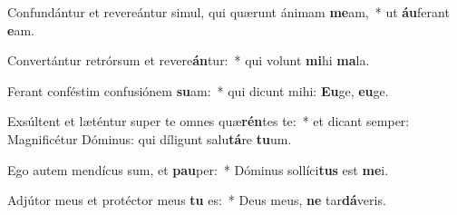 \item Confundántur et revereántur simul, qui quærunt ánimam \textbf{me}am,~* ut \textbf{áu}ferant \textbf{e}am.
\item Convertántur retrórsum et revere\textbf{án}tur:~* qui volunt \textbf{mi}hi \textbf{ma}la.
\item Ferant conféstim confusiónem \textbf{su}am:~* qui dicunt mihi: \textbf{Eu}ge, \textbf{eu}ge.
\item Exsúltent et læténtur super te omnes quæ\textbf{rén}tes te:~* et dicant semper: Magnificétur Dóminus: qui díligunt salu\textbf{tá}re \textbf{tu}um.
\item Ego autem mendícus sum, et \textbf{pau}per:~* Dóminus sollíci\textbf{tus} est \textbf{me}i.
\item Adjútor meus et protéctor meus \textbf{tu} es:~* Deus meus, \textbf{ne} tar\textbf{dá}veris.
